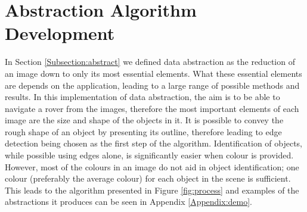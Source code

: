\chapter{Abstraction Algorithm Development}
\label{chapter:abstract}

In Section \ref{Subsection:abstract} we defined data abstraction as the reduction of an image down to only its most essential elements. What these essential elements are depends on the application, leading to a large range of possible methods and results. In this implementation of data abstraction, the aim is to be able to navigate a rover from the images, therefore the most important elements of each image are the size and shape of the objects in it. It is possible to convey the rough shape of an object by presenting its outline, therefore leading to edge detection being chosen as the first step of the algorithm. Identification of objects, while possible using edges alone, is significantly easier when colour is provided. However, most of the colours in an image do not aid in object identification; one colour (preferably the average colour) for each object in the scene is sufficient. This leads to the algorithm presented in Figure \ref{fig:process} and examples of the abstractions it produces can be seen in Appendix \ref{Appendix:demo}.

